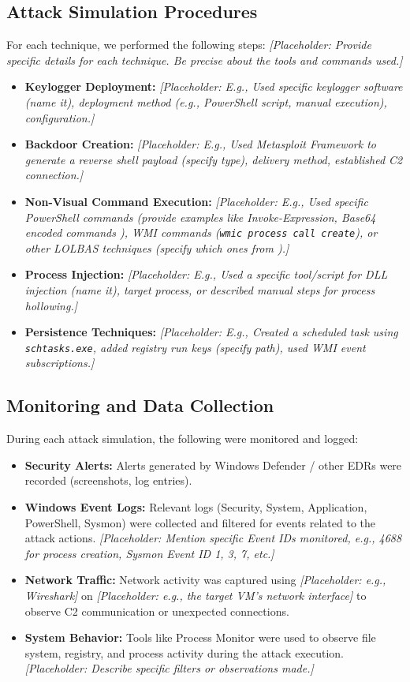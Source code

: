 \documentclass{ULBreport}
\begin{document}
\subsection{Attack Simulation Procedures}
For each technique, we performed the following steps: \textit{[Placeholder: Provide specific details for each technique. Be precise about the tools and commands used.]}
\begin{itemize}
	\item \textbf{Keylogger Deployment:} \textit{[Placeholder: E.g., Used specific keylogger software (name it), deployment method (e.g., PowerShell script, manual execution), configuration.]}
	\item \textbf{Backdoor Creation:} \textit{[Placeholder: E.g., Used Metasploit Framework \cite{metasploit_docs} to generate a reverse shell payload (specify type), delivery method, established C2 connection.]}
	\item \textbf{Non-Visual Command Execution:} \textit{[Placeholder: E.g., Used specific PowerShell commands (provide examples like Invoke-Expression, Base64 encoded commands \cite{powershell_docs}), WMI commands (\texttt{wmic process call create}), or other LOLBAS techniques (specify which ones from \cite{lolbas}).]}
	\item \textbf{Process Injection:} \textit{[Placeholder: E.g., Used a specific tool/script for DLL injection (name it), target process, or described manual steps for process hollowing.]}
	\item \textbf{Persistence Techniques:} \textit{[Placeholder: E.g., Created a scheduled task using \texttt{schtasks.exe}, added registry run keys (specify path), used WMI event subscriptions.]}
\end{itemize}

\subsection{Monitoring and Data Collection}
During each attack simulation, the following were monitored and logged:
\begin{itemize}
	\item \textbf{Security Alerts:} Alerts generated by Windows Defender / other EDRs were recorded (screenshots, log entries).
	\item \textbf{Windows Event Logs:} Relevant logs (Security, System, Application, PowerShell, Sysmon) were collected and filtered for events related to the attack actions. \textit{[Placeholder: Mention specific Event IDs monitored, e.g., 4688 for process creation, Sysmon Event ID 1, 3, 7, etc.]}
	\item \textbf{Network Traffic:} Network activity was captured using \textit{[Placeholder: e.g., Wireshark]} on \textit{[Placeholder: e.g., the target VM's network interface]} to observe C2 communication or unexpected connections.
	\item \textbf{System Behavior:} Tools like Process Monitor were used to observe file system, registry, and process activity during the attack execution. \textit{[Placeholder: Describe specific filters or observations made.]}
\end{itemize}
\end{document}
